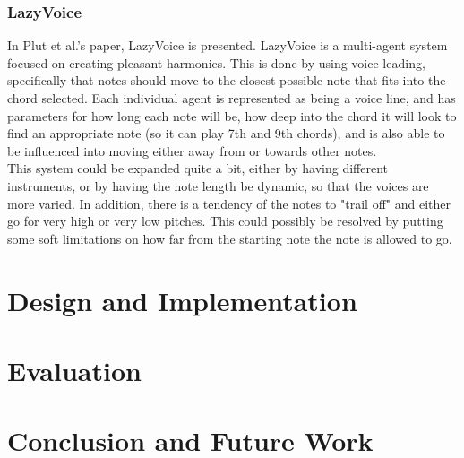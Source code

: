 \documentclass[a4paper,english]{report}
\begin{document}
	\subsection{LazyVoice}
	In Plut et al.'s paper, LazyVoice is presented. LazyVoice is a multi-agent system focused on creating pleasant harmonies. This is done by using voice leading, specifically that notes should move to the closest possible note that fits into the chord selected. Each individual agent is represented as being a voice line, and has parameters for how long each note will be, how deep into the chord it will look to find an appropriate note (so it can play 7th and 9th chords), and is also able to be influenced into moving either away from or towards other notes.\\
	This system could be expanded quite a bit, either by having different instruments, or by having the note length be dynamic, so that the voices are more varied. In addition, there is a tendency of the notes to "trail off" and either go for very high or very low pitches. This could possibly be resolved by putting some soft limitations on how far from the starting note the note is allowed to go.
	\fi
	
	\chapter{Design and Implementation}
	
	\chapter{Evaluation}
	
	\chapter{Conclusion and Future Work}
	 
\end{document}
